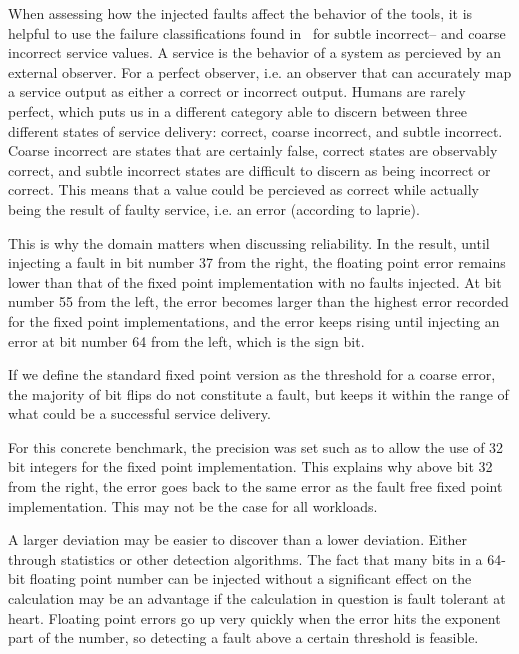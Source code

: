 When assessing how the injected faults affect the behavior of the tools, it is helpful to use the failure classifications found in~\citet{failure_class_with_respect_to_detection} for subtle incorrect-- and coarse incorrect service values. A service is the behavior of a system as percieved by an external observer. For a perfect observer, i.e. an observer that can accurately map a service output as either a correct or incorrect output. Humans are rarely perfect, which puts us in a different category able to discern between three different states of service delivery: correct, coarse incorrect, and subtle incorrect.  Coarse incorrect are states that are certainly false, correct states are observably correct, and subtle incorrect states are difficult to discern as being incorrect or correct. This means that a value could be percieved as correct while actually being the result of faulty service, i.e. an error (according to laprie).

This is why the domain matters when discussing reliability. In the result, until injecting a fault in bit number 37 from the right, the floating point error remains lower than that of the fixed point implementation with no faults injected. At bit number 55 from the left, the error becomes larger than the highest error recorded for the fixed point implementations, and the error keeps rising until injecting an error at bit number 64 from the left, which is the sign bit.

If we define the standard fixed point version as the threshold for a coarse error, the majority of bit flips do not constitute a fault, but keeps it within the range of what could be a successful service delivery. 


For this concrete benchmark, the precision was set such as to allow the use of 32 bit integers for the fixed point implementation. This explains why above bit 32 from the right, the error goes back to the same error as the fault free fixed point implementation. This may not be the case for all workloads. 



A larger deviation may be easier to discover than a lower deviation. Either through statistics or other detection algorithms. The fact that many bits in a 64-bit floating point number can be injected without a significant effect on the calculation may be an advantage if the calculation in question is fault tolerant at heart. Floating point errors go up very quickly when the error hits the exponent part of the number, so detecting a fault above a certain threshold is feasible.

